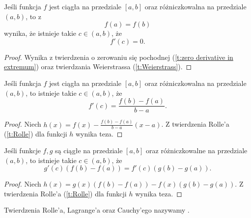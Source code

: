 \documentclass[11pt]{scrartcl}
\begin{document}
    \begin{theorem}[Rolle'a]
        \label{t:Rolle}
        Jeśli funkcja $f$ jest ciągła na przedziale $[a, b]$ oraz różniczkowalna na przedziale $(a, b)$, to z
        \[ f(a) = f(b) \]
        wynika, że istnieje takie $c \in (a, b)$, że
        \[ f'(c) = 0. \]
    \end{theorem}
    \begin{proof}
        Wynika z twierdzenia o zerowaniu się pochodnej (\ref{t:zero derivative in extremum}) oraz twierdzania Weierstrassa (\ref{t:Weierstrass}).
    \end{proof}

    \begin{theorem}[Lagrange'a]
        Jeśli funkcja $f$ jest ciągła na przedziale $[a, b]$ oraz różniczkowalna na przedziale $(a, b)$, to istnieje takie $c \in (a, b)$, że
        \[ f'(c) = \frac{f(b) - f(a)}{b - a}. \]
    \end{theorem}
    \begin{proof}
        Niech $h(x) = f(x) - \frac{f(b) - f(a)}{b - a}(x - a)$. Z twierdzenia Rolle'a (\ref{t:Rolle}) dla funkcji $h$ wynika teza.
    \end{proof}

    \begin{theorem}
        Jeśli funkcje $f, g$ są ciągłe na przedziale $[a, b]$ oraz różniczkowalne na przedziale $(a, b)$, to istnieje takie $c \in (a, b)$, że
        \[ g'(c) (f(b) - f(a)) = f'(c) (g(b) - g(a)). \]
    \end{theorem}
    \begin{proof}
        Niech $h(x) = g(x)(f(b) - f(a)) - f(x)(g(b) - g(a))$. Z twierdzenia Rolle'a (\ref{t:Rolle}) dla funkcji $h$ wynika teza.
    \end{proof}

    Twierdzenia Rolle'a, Lagrange'a oraz Cauchy'ego nazywamy .
\end{document}

